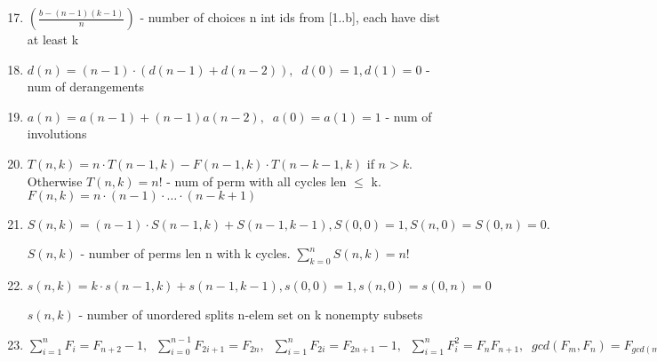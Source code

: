 \begin{large}
	\begin{enumerate}
		\setcounter{enumi}{16}
		\item $\left( \frac{b-(n-1)(k-1)}{n} \right)$ - number of choices n int ids from [1..b], each have dist at least k
		\item $d(n)=(n-1) \cdot (d(n-1)+d(n-2)),\;\; d(0)=1,d(1)=0$ - num of derangements
		\item $a(n)=a(n-1) + (n-1)a(n-2),\;\;a(0) = a(1) = 1$ - num of involutions
		\item $T(n, k)= n \cdot T(n-1, k) - F(n-1, k) \cdot T(n-k-1, k)$ if $n > k$. Otherwise $T(n,k)=n!$ - num of perm with all cycles len $\leq$ k. $F(n, k) = n \cdot (n - 1) \cdot … \cdot (n - k + 1)$
		\item $S(n,k)=(n-1) \cdot S(n-1,k)+S(n-1,k-1), S(0,0)=1,S(n,0)=S(0,n)=0.$ \par
		 $S(n,k)$ - number of perms len n with k cycles. $\sum_{k=0}^{n}S(n,k) = n!$
		\item $s(n,k)=k \cdot s(n-1,k)+s(n-1,k-1), s(0,0)=1,s(n,0)=s(0,n)=0$ \par
		 $s(n,k)$ - number of unordered splits n-elem set on k nonempty subsets
		\item $\sum\limits_{i=1}^{n}F_i=F_{n+2}-1,\;\; \sum\limits_{i=0}^{n-1}F_{2i+1}=F_{2n},\;\; \sum\limits_{i=1}^{n}F_{2i}=F_{2n+1}-1,\;\;
		\sum\limits_{i=1}^{n}F_{i}^{2}=F_nF_{n+1},\;\;
		gcd(F_m, F_n)=F_{gcd(m, n)}$
	\end{enumerate}
\end{large}